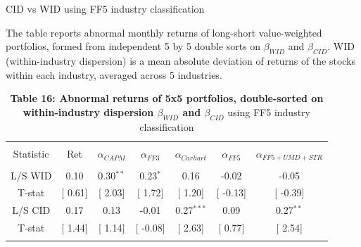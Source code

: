 \documentclass{beamer}
\begin{document}
\begin{frame}{CID vs WID using FF5 industry classification}
\begin{table}[!htbp] \centering 
  \caption*{\textbf{Table 16: Abnormal returns of 5x5 portfolios, double-sorted on within-industry dispersion $\beta_{WID}$ and $\beta_{CID}$} using FF5 industry classification} 
  \label{} 
  \begin{flushleft}
    {\medskip\scriptsize
 The table reports abnormal monthly returns of long-short value-weighted portfolios, formed from independent 5 by 5 double sorts on $\beta_{WID}$ and $\beta_{CID}$. WID (within-industry dispersion) is a mean absolute deviation of returns of the stocks within each industry, averaged across 5 industries.}
    \medskip
    \end{flushleft}
\begin{tabular}{@{\extracolsep{5pt}} ccccccc} 
\\[-1.8ex]\hline 
\hline \\[-1.8ex] 
Statistic & Ret & $\alpha_{CAPM}$ & $\alpha_{FF3}$ & $\alpha_{Carhart}$ & $\alpha_{FF5}$ & $\alpha_{FF5+UMD+STR}$ \\ 
\hline \\[-1.8ex] 
L/S WID & 0.10 & 0.30$^{**}$ & 0.23$^{*}$ & 0.16 & -0.02 & -0.05 \\ 
T-stat & [ 0.61] & [ 2.03] & [ 1.72] & [ 1.20] & [ -0.13] & [ -0.39] \\
L/S CID & 0.17 & 0.13 & -0.01 & 0.27$^{***}$ & 0.09 & 0.27$^{**}$ \\ 
T-stat & [ 1.44] & [ 1.14] & [ -0.08] & [ 2.63] & [ 0.77] & [ 2.54] \\ 
\hline \\[-1.8ex]
\end{tabular} 
\end{table}
\end{frame}
\end{document}
